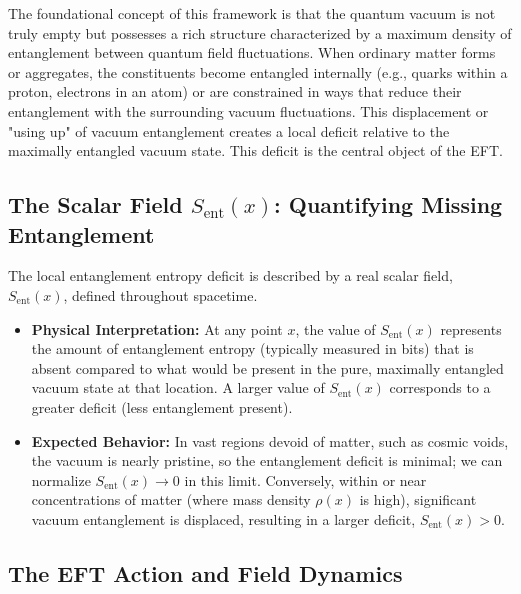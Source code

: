 \documentclass[11pt]{article}
\begin{document}
The foundational concept of this framework \cite{Chinitz2025} is that the quantum vacuum is not truly empty but possesses a rich structure characterized by a maximum density of entanglement between quantum field fluctuations. When ordinary matter forms or aggregates, the constituents become entangled internally (e.g., quarks within a proton, electrons in an atom) or are constrained in ways that reduce their entanglement with the surrounding vacuum fluctuations. This displacement or "using up" of vacuum entanglement creates a local deficit relative to the maximally entangled vacuum state. This deficit is the central object of the EFT.

\subsection{The Scalar Field $S_{\mathrm{ent}}(x)$: Quantifying Missing Entanglement}

The local entanglement entropy deficit is described by a real scalar field, $S_{\mathrm{ent}}(x)$, defined throughout spacetime.
\begin{itemize}
    \item \textbf{Physical Interpretation:} At any point $x$, the value of $S_{\mathrm{ent}}(x)$ represents the amount of entanglement entropy (typically measured in bits) that is absent compared to what would be present in the pure, maximally entangled vacuum state at that location. A larger value of $S_{\mathrm{ent}}(x)$ corresponds to a greater deficit (less entanglement present).
    \item \textbf{Expected Behavior:} In vast regions devoid of matter, such as cosmic voids, the vacuum is nearly pristine, so the entanglement deficit is minimal; we can normalize $S_{\mathrm{ent}}(x) \to 0$ in this limit. Conversely, within or near concentrations of matter (where mass density $\rho(x)$ is high), significant vacuum entanglement is displaced, resulting in a larger deficit, $S_{\mathrm{ent}}(x) > 0$.
\end{itemize}

\subsection{The EFT Action and Field Dynamics}
\end{document}
